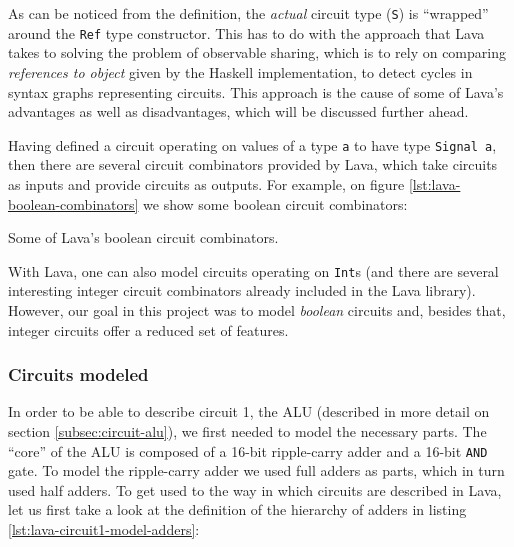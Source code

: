         As can be noticed from the definition, the \emph{actual} circuit type (\texttt{S}) is
        ``wrapped'' around the \texttt{Ref} type constructor. This has to do with the approach that
        Lava takes to solving the problem of observable sharing, which is to rely on comparing
        \emph{references to object} given by the Haskell implementation, to detect cycles in syntax
        graphs representing circuits. This approach is the cause of some of Lava's advantages as
        well as disadvantages, which will be discussed further ahead.

        Having defined a circuit operating on values of a type \texttt{a} to have type
        \texttt{Signal a}, then there are several circuit combinators provided by Lava, which take
        circuits as inputs and provide circuits as outputs. For example, on figure
        \ref{lst:lava-boolean-combinators} we show some boolean circuit combinators:

        \begin{listing}[h!]
            \caption{Some of Lava's boolean circuit combinators.
                \label{lst:lava-boolean-combinators}}
        \end{listing}

        With Lava, one can also model circuits operating on \texttt{Int}s (and there are several
        interesting integer circuit combinators already included in the Lava library). However, our
        goal in this project was to model \emph{boolean} circuits and, besides that, integer
        circuits offer a reduced set of features.


        \subsubsection{Circuits modeled}
        \label{subsubsec:lava-circuits}

            In order to be able to describe circuit 1, the ALU (described in more detail on section
            \ref{subsec:circuit-alu}), we first needed to model the necessary parts. The ``core'' of
            the ALU is composed of a 16-bit ripple-carry adder and a 16-bit \texttt{AND} gate. To
            model the ripple-carry adder we used full adders as parts, which in turn used half
            adders. To get used to the way in which circuits are described in Lava, let us first
            take a look at the definition of the hierarchy of adders in listing
            \ref{lst:lava-circuit1-model-adders}:

